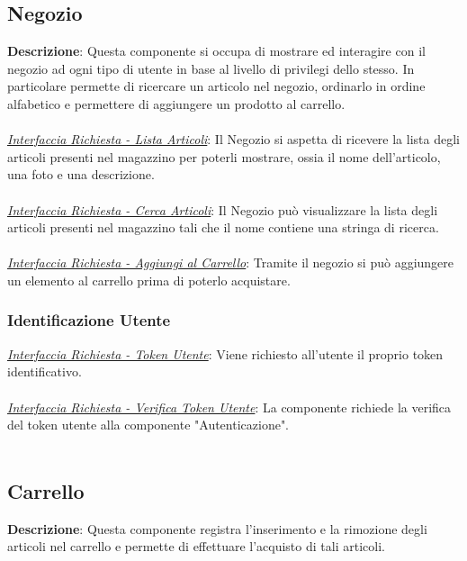 \documentclass{report}
\begin{document}

\subsection*{Negozio}
\textbf{Descrizione}: Questa componente si occupa di mostrare  ed interagire con il negozio ad ogni tipo di utente in base al livello di privilegi dello stesso. In particolare permette di ricercare un articolo nel negozio, ordinarlo in ordine alfabetico e permettere di aggiungere un prodotto al carrello.\\\\
\uline{\textit{Interfaccia Richiesta - Lista Articoli}}: 
Il Negozio si aspetta di ricevere la lista degli articoli presenti nel magazzino per poterli mostrare, ossia il nome dell'articolo, una foto e una descrizione. \\ \\
\uline{\textit{Interfaccia Richiesta - Cerca Articoli}}: 
Il Negozio può visualizzare la lista degli articoli presenti nel magazzino tali che il nome contiene una stringa di ricerca.\\\\
\uline{\textit{Interfaccia Richiesta - Aggiungi al Carrello}}: 
Tramite il negozio si può aggiungere un elemento al carrello prima di poterlo acquistare. 
\subsubsection*{\indent \indent Identificazione Utente}
\textcolor{Auth}{\uline{\textit{Interfaccia Richiesta - Token Utente}}}: 
Viene richiesto all'utente il proprio token identificativo.\\ \\
\textcolor{Auth}{\uline{\textit{Interfaccia Richiesta - Verifica Token Utente}}}: 
La componente richiede la verifica del token utente alla componente "Autenticazione".\\\\

\subsection*{Carrello}
\textbf{Descrizione}: Questa componente registra l'inserimento e la rimozione degli articoli nel carrello e permette di effettuare l'acquisto di tali articoli. 
\end{document}
